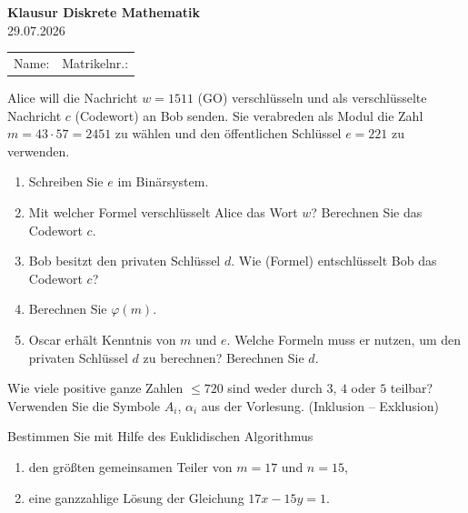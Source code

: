 
\usepackage[a4paper,margin=2.2cm]{geometry}
\usepackage{fancyhdr}
\pagestyle{fancy}\fancyhf{}
\setlength{\parindent}{0pt}\setlength{\parskip}{4pt}
\setcounter{secnumdepth}{1}



\begin{center}
{\LARGE\bfseries Klausur Diskrete Mathematik}\\[4pt]
{\large 29.07.2026}
\end{center}

\vspace{6pt}
\begin{tabular}{@{}p{}p{}@{}}
Name: \hrulefill & Matrikelnr.: \hrulefill
\end{tabular}

\vspace{10pt}

\begin{aufgabe}
Alice will die Nachricht $w = 1511$ (GO) verschlüsseln und als verschlüsselte Nachricht $c$ (Codewort)
an Bob senden. Sie verabreden als Modul die Zahl $m = 43 \cdot 57 = 2451$ zu wählen und den
öffentlichen Schlüssel $e = 221$ zu verwenden.
\begin{enumerate}[label=\alph*)]
  \item Schreiben Sie $e$ im Binärsystem.
  \item Mit welcher Formel verschlüsselt Alice das Wort $w$? Berechnen Sie das Codewort $c$.
  \item Bob besitzt den privaten Schlüssel $d$. Wie (Formel) entschlüsselt Bob das Codewort $c$?
  \item Berechnen Sie $\varphi(m)$.
  \item Oscar erhält Kenntnis von $m$ und $e$. Welche Formeln muss er nutzen, um den privaten
        Schlüssel $d$ zu berechnen? Berechnen Sie $d$.
\end{enumerate}
\end{aufgabe}

\begin{aufgabe}
Wie viele positive ganze Zahlen $\leq 720$ sind weder durch $3$, $4$ oder $5$ teilbar?
Verwenden Sie die Symbole $A_i$, $\alpha_i$ aus der Vorlesung. (Inklusion -- Exklusion)
\end{aufgabe}

\begin{aufgabe}
Bestimmen Sie mit Hilfe des Euklidischen Algorithmus
\begin{enumerate}[label=\alph*)]
  \item den größten gemeinsamen Teiler von $m = 17$ und $n = 15$,
  \item eine ganzzahlige Lösung der Gleichung $17x - 15y = 1$.
\end{enumerate}
\end{aufgabe}


